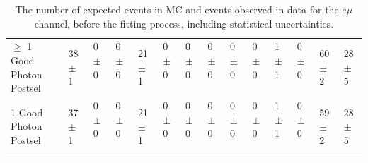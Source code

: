 \begin{table}
{\begin{tabular}{|l|l|l|l|l|l|l|l|l|l|l|l|l|l|}
$\geq$ 1 Good Photon Postsel & 38 $\pm$ 1 \ & 0 $\pm$ 0 \ & 0 $\pm$ 0 \ & 21 $\pm$ 1 \ & 0 $\pm$ 0 \ & 0 $\pm$ 0 \ & 0 $\pm$ 0 \ & 0 $\pm$ 0 \ & 0 $\pm$ 0 \ & 1 $\pm$ 1 \ & 0 $\pm$ 0 \ & 60 $\pm$ 2\ & 28 $\pm$ 5 \\
1 Good Photon Postsel & 37 $\pm$ 1 \ & 0 $\pm$ 0 \ & 0 $\pm$ 0 \ & 21 $\pm$ 1 \ & 0 $\pm$ 0 \ & 0 $\pm$ 0 \ & 0 $\pm$ 0 \ & 0 $\pm$ 0 \ & 0 $\pm$ 0 \ & 1 $\pm$ 1 \ & 0 $\pm$ 0 \ & 59 $\pm$ 2\ & 28 $\pm$ 5 \\
\hline
\end{tabular}
}
\caption{The number of expected events in MC and events observed in data for the $e\mu$ channel, before the fitting process, including statistical uncertainties.}
\label{tab-cutflowEMu}
\end{table}

